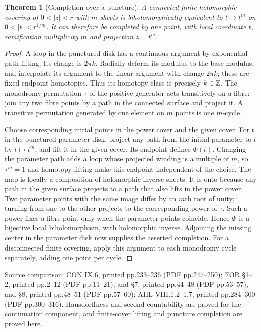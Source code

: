 \documentclass[11pt,a4paper,openany]{book}
\newtheorem{theorem}{Theorem}[chapter]
\theoremstyle{definition}
\theoremstyle{remark}\newtheorem{remark}[theorem]{Remark}
\newcommand{\family}[1]{}
\newcommand{\source}[1]{\par\begingroup\small\sffamily\color{black!65}Source comparison: #1\par\endgroup}
\begin{document}
\begin{theorem}[Completion over a puncture]\label{d12:20-08}\family{D12.20.08}
A connected finite holomorphic covering of $0<|z|<r$ with $m$ sheets is
biholomorphically equivalent to $t\mapsto t^m$ on $0<|t|<r^{1/m}$.
It can therefore be completed by one point, with local coordinate $t$,
ramification multiplicity $m$ and projection $z=t^m$.
\end{theorem}
\begin{proof}
A loop in the punctured disk has a continuous argument by exponential
path lifting. Its change is $2\pi k$. Radially deform its modulus to the
base modulus, and interpolate its argument to the linear argument with
change $2\pi k$; these are fixed-endpoint homotopies. Thus its homotopy
class is precisely $k\in\mathbb Z$. The monodromy permutation $\tau$ of the
positive generator acts transitively on a fibre: join any two fibre
points by a path in the connected surface and project it. A transitive
permutation generated by one element on $m$ points is one $m$-cycle.

Choose corresponding initial points in the power cover and the given
cover. For $t$ in the punctured parameter disk, project any path from
the initial parameter to $t$ by $t\mapsto t^m$, and lift it in the given
cover. Its endpoint defines $\Phi(t)$. Changing the parameter path
adds a loop whose projected winding is a multiple of $m$, so $\tau^m=1$
and homotopy lifting make this endpoint independent of the choice.
The map is locally a composition of holomorphic inverse sheets. It is
onto because any path in the given surface projects to a path that also
lifts in the power cover. Two parameter points with the same image
differ by an $m$th root of unity; turning from one to the other projects
to the corresponding power of $\tau$. Such a power fixes a fibre point
only when the parameter points coincide. Hence $\Phi$ is a bijective
local biholomorphism, with holomorphic inverse. Adjoining the missing
center in the parameter disk now supplies the asserted completion.
For a disconnected finite covering, apply this argument to each
monodromy cycle separately, adding one point per cycle.
\end{proof}
\source{CON IX.6, printed pp.233--236 (PDF pp.247--250);
FOR \S1--2, printed pp.2--12 (PDF pp.11--21), and \S7, printed pp.44--48
(PDF pp.53--57), and \S8, printed pp.48--51 (PDF pp.57--60);
AHL VIII.1.2--1.7, printed pp.284--300 (PDF pp.300--316).
Hausdorffness and second countability are proved for the continuation
component, and finite-cover lifting and puncture completion are proved here.}
\end{document}
